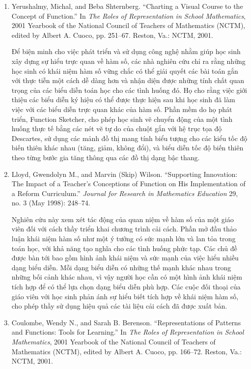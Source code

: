 \documentclass[
  10pt,
  a4paper,
  landscape,
  twoside,
  openany
]{scrbook}
\newcommand{\VI}[1]{#1}
\begin{document}
{
\VI{
  \begin{enumerate}
    \item Yerushalmy, Michal, and Beba Shternberg. ``Charting a Visual Course to the Concept of Function.'' In \emph{The Roles of Representation in School Mathematics}, 2001 Yearbook of the National Council of Teachers of Mathematics (NCTM), edited by Albert A. Cuoco, pp. 251--67. Reston, Va.: NCTM, 2001.

      Để biện minh cho việc phát triển và sử dụng công nghệ nhằm giúp học sinh xây dựng sự hiểu trực quan về hàm số, các nhà nghiên cứu chỉ ra rằng những học sinh có khái niệm hàm số vững chắc có thể giải quyết các bài toán gắn với thực tiễn một cách dễ dàng hơn và nhận diện được những tính chất quan trọng của các biểu diễn toán học cho các tình huống đó. Họ cho rằng việc giới thiệu các biểu diễn ký hiệu có thể được thực hiện sau khi học sinh đã làm việc với các biểu diễn trực quan khác của hàm số. Phần mềm do họ phát triển, Function Sketcher, cho phép học sinh vẽ chuyển động của một tình huống thực tế bằng các nét vẽ tự do của chuột gắn với hệ trục tọa độ Descartes, sử dụng các mảnh đồ thị mang tính biểu tượng cho các kiểu tốc độ biến thiên khác nhau (tăng, giảm, không đổi), và biểu diễn tốc độ biến thiên theo từng bước gia tăng thông qua các đồ thị dạng bậc thang.

    \item Lloyd, Gwendolyn M., and Marvin (Skip) Wilson. ``Supporting Innovation: The Impact of a Teacher's Conceptions of Function on His Implementation of a Reform Curriculum.'' \emph{Journal for Research in Mathematics Education} 29, no. 3 (May 1998): 248--74.

      Nghiên cứu này xem xét tác động của quan niệm về hàm số của một giáo viên đối với cách thầy triển khai chương trình cải cách. Phần mở đầu thảo luận khái niệm hàm số như một ý tưởng có sức mạnh lớn và lan tỏa trong toán học, với khả năng tạo nghĩa cho các tình huống phức tạp. Các chủ đề được bàn tới bao gồm hình ảnh khái niệm và sức mạnh của việc hiểu nhiều dạng biểu diễn. Mỗi dạng biểu diễn có những thế mạnh khác nhau trong những bối cảnh khác nhau, vì vậy người học cần có một hình ảnh khái niệm tích hợp để có thể lựa chọn dạng biểu diễn phù hợp. Các cuộc đối thoại của giáo viên với học sinh phản ánh sự hiểu biết tích hợp về khái niệm hàm số, cho phép thầy sử dụng hiệu quả các tài liệu cải cách đã được xuất bản.

    \item Coulombe, Wendy N., and Sarah B. Berenson. ``Representations of Patterns and Functions: Tools for Learning.'' In \emph{The Roles of Representation in School Mathematics}, 2001 Yearbook of the National Council of Teachers of Mathematics (NCTM), edited by Albert A. Cuoco, pp. 166--72. Reston, Va.: NCTM, 2001.


\end{enumerate}}}
\end{document}
